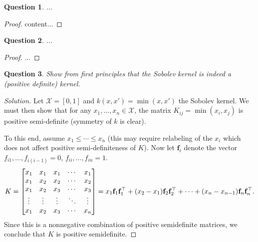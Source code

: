\documentclass{article}
\theoremstyle{plain}
\newtheorem{question}{Question}
\theoremstyle{remark}
\newenvironment{solution}{\begin{proof}[Solution]\renewcommand\qedsymbol{}}{\end{proof}}
\renewcommand{\vec}{\mathbf}
\newcommand{\Cal}{\mathcal}
\newcommand\XX{\Cal X}
\newcommand{\T}{^\top} %
\begin{document}
\begin{question}
	...
\end{question}

\begin{proof}
	content...
\end{proof}

\begin{question}
	...
\end{question}

\begin{proof}
	...
\end{proof}

\begin{question}
	Show from first principles that the Sobolev kernel is indeed a (positive definite) kernel.
\end{question}

\begin{solution}
	Let $\XX = [0, 1]$ and $k(x, x') = \min(x, x')$ the Sobolev kernel. We must then show that for any $x_1, \dotsc, x_n \in \XX$, the matrix $K_{ij} = \min(x_i, x_j)$ is positive semi-definite (symmetry of $k$ is clear). 
	
	To this end, assume $x_1 \leq \dotsb \leq x_n$ (this may require relabeling of the $x_i$ which does not affect positive semi-definiteness of $K$). Now let $\vec f_i$ denote the vector $f_{i1}, \dotsc, f_{i(i-1)} = 0$, $f_{ii}, \dotsc, f_{in} = 1$. 
	\[
	K = \mqty[ x_1 & x_1 & x_1 & \cdots & x_1 \\
	x_1 & x_2 & x_2 & \dotsb & x_2 \\
	x_1 & x_2 & x_3 & \dotsb & x_3 \\
	\vdots & \vdots & \vdots & \ddots & \vdots \\
	x_1 & x_2 & x_3 & \cdots & x_n] = x_1 \vec f_1 \vec f_1\T + (x_2 - x_1) \vec f_2 \vec f_2\T + \dotsb + (x_n - x_{n-1}) \vec f_n \vec f_n\T. 
	\]
	Since this is a nonnegative combination of positive semidefinite matrices, we conclude that $K$ is positive semidefinite. 
\end{solution}
\end{document}

